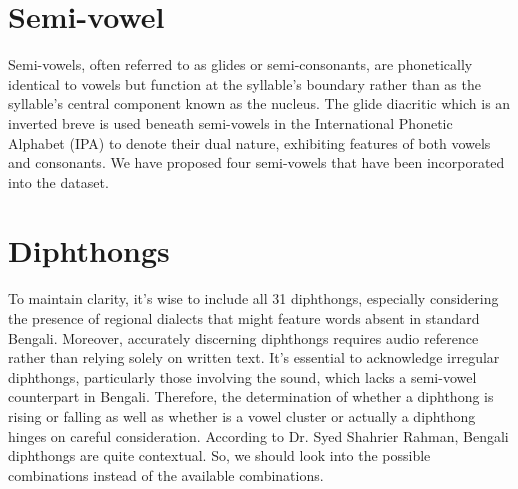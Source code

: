 \section{Semi-vowel}
Semi-vowels, often referred to as glides or semi-consonants, are phonetically identical to vowels but function at the syllable's boundary rather than as the syllable's central component known as the nucleus. The glide diacritic which is an inverted breve  is used beneath semi-vowels in the International Phonetic Alphabet (IPA) to denote their dual nature, exhibiting features of both vowels and consonants. We have proposed four semi-vowels that have been incorporated into the dataset.

\begin{table}[!htbp]
    \centering
    \caption{Proposed Semi-vowel Chart}
    \label{tab:proposed_framework_semi_vowel}
\end{table}


\section{Diphthongs}
To maintain clarity, it's wise to include all 31 diphthongs, especially considering the presence of regional dialects that might feature words absent in standard Bengali. Moreover, accurately discerning diphthongs requires audio reference rather than relying solely on written text. It's essential to acknowledge irregular diphthongs, particularly those involving the  sound, which lacks a semi-vowel counterpart in Bengali. Therefore, the determination of whether a diphthong is rising or falling as well as whether is a vowel cluster or actually a diphthong hinges on careful consideration. According to Dr. Syed Shahrier Rahman, Bengali diphthongs are quite
contextual. So, we should look into the possible combinations instead of the available
combinations.



